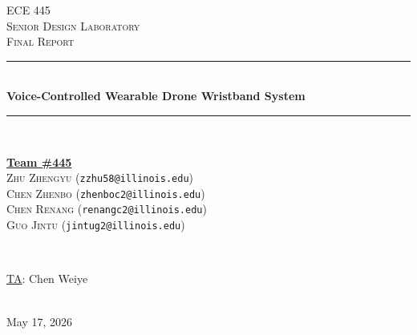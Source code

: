 \documentclass[12pt]{article}
\begin{document}
\hypersetup{pageanchor=false}

\begin{titlepage}
\newcommand{\HRule}{\rule{\linewidth}{0.1mm}}
\center

\textsc{\Large ECE 445}\\[0.5cm]
\textsc{\large Senior Design Laboratory}\\[0.5cm]
\textsc{\Large Final Report}\\[0.5cm]

\HRule \\[0.5cm]
\huge \textbf{Voice-Controlled Wearable Drone Wristband System}
\HRule \\[2cm]

\begin{minipage}{0.72\textwidth}
    \begin{center} \large
        \underline{\textbf{Team \#445}} \\ \medskip
        \textsc{Zhu Zhengyu} (\texttt{zzhu58@illinois.edu}) \\[0.35em]
        \textsc{Chen Zhenbo} (\texttt{zhenboc2@illinois.edu}) \\[0.35em]
        \textsc{Chen Renang} (\texttt{renangc2@illinois.edu}) \\[0.35em]
        \textsc{Guo Jintu} (\texttt{jintug2@illinois.edu}) \\
    \end{center}
\end{minipage} \\[1.5cm]

\begin{minipage}{0.5\textwidth}
    \begin{center} \large
        \underline{TA}: Chen Weiye
    \end{center}
\end{minipage} \\[1cm]

{\large May 17, 2026}

\vfill
\end{titlepage}

\setcounter{page}{2}


\clearpage

\tableofcontents
\newpage
\end{document}

